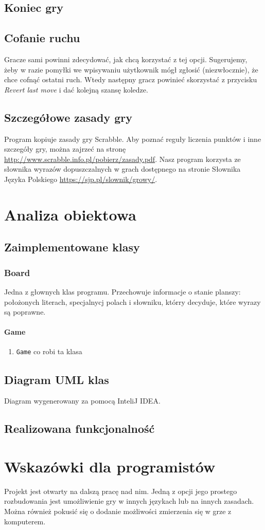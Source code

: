 \documentclass[a4paper]{article}
\begin{document}
\subsection{Koniec gry}
\subsection{Cofanie ruchu}
Gracze sami powinni zdecydować, jak chcą korzystać z tej opcji. Sugerujemy, żeby w razie pomyłki we wpisywaniu użytkownik mógł zgłosić (niezwłocznie), że chce cofnąć ostatni ruch. Wtedy następny gracz powinieć skorzystać z przycisku \textit{Revert last move} i dać kolejną szansę koledze.
\subsection{Szczegółowe zasady gry}
Program kopiuje zasady gry Scrabble. Aby poznać reguły liczenia punktów i inne szczegóły gry, można zajrzeć na stronę \url{http://www.scrabble.info.pl/pobierz/zasady.pdf}. Nasz program korzysta ze słownika wyrazów dopuszczalnych w grach dostępnego na stronie Słownika Języka Polskiego \url{https://sjp.pl/slownik/growy/}.
\section{Analiza obiektowa}
\subsection{Zaimplementowane klasy}
\subsubsection{Board} Jedna z głownych klas programu. Przechowuje informacje o stanie planszy: położonych literach, specjalnycj polach i słowniku, którry decyduje, które wyrazy są poprawne.
\paragraph{Game}
\begin{enumerate}
\item[] \texttt{Game} co robi ta klasa
\end{enumerate}
\subsection{Diagram UML klas}
Diagram wygenerowany za pomocą InteliJ IDEA.
\subsection{Realizowana funkcjonalność}
\section{Wskazówki dla programistów}
Projekt jest otwarty na dalszą pracę nad nim. Jedną z opcji jego prostego rozbudowania jest umożliwienie gry w innych językach lub na innych zasadach. Można również pokusić się o dodanie możliwości zmierzenia się w grze z komputerem.
\end{document}
